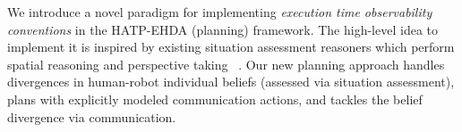 \documentclass[letterpaper]{article} %
\begin{document}


We introduce a novel paradigm for implementing {\em execution time observability conventions} in the HATP-EHDA (planning) framework. The high-level idea to implement it is inspired by existing situation assessment reasoners which perform spatial reasoning and perspective taking ~\cite{flavell1992perspectives,trafton2005enabling,johnson2005perceptual,Sisbot2011SituationAF}. 
Our new planning approach 
handles divergences in human-robot individual beliefs (assessed via situation assessment), 
plans with explicitly modeled communication actions, and tackles the belief divergence 
via communication.

\end{document}
